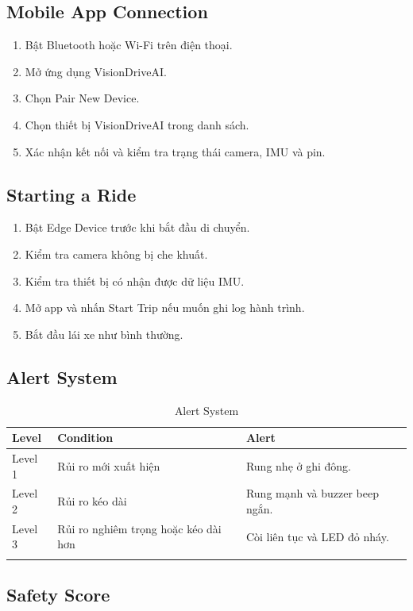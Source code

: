 \documentclass[12pt,a4paper]{article}
\begin{document}
\subsection{Mobile App Connection}

\begin{enumerate}
    \item Bật Bluetooth hoặc Wi-Fi trên điện thoại.
    \item Mở ứng dụng VisionDriveAI.
    \item Chọn Pair New Device.
    \item Chọn thiết bị VisionDriveAI trong danh sách.
    \item Xác nhận kết nối và kiểm tra trạng thái camera, IMU và pin.
\end{enumerate}

\subsection{Starting a Ride}

\begin{enumerate}
    \item Bật Edge Device trước khi bắt đầu di chuyển.
    \item Kiểm tra camera không bị che khuất.
    \item Kiểm tra thiết bị có nhận được dữ liệu IMU.
    \item Mở app và nhấn Start Trip nếu muốn ghi log hành trình.
    \item Bắt đầu lái xe như bình thường.
\end{enumerate}

\subsection{Alert System}

\begin{longtable}{|P{2.5cm}|P{5cm}|P{6.5cm}|}
\hline
\textbf{Level} & \textbf{Condition} & \textbf{Alert} \\
\hline
Level 1 & Rủi ro mới xuất hiện & Rung nhẹ ở ghi đông. \\
\hline
Level 2 & Rủi ro kéo dài & Rung mạnh và buzzer beep ngắn. \\
\hline
Level 3 & Rủi ro nghiêm trọng hoặc kéo dài hơn & Còi liên tục và LED đỏ nháy. \\
\hline
\caption{Alert System}
\end{longtable}

\subsection{Safety Score}
\end{document}
